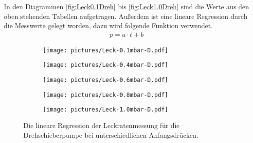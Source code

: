 In den Diagrammen \eqref{fig:Leck0.1Dreh} bis \eqref{fig:Leck1.0Dreh} sind die Werte aus den oben stehenden Tabellen aufgetragen. Außerdem ist eine lineare Regression durch die Messwerte gelegt worden, dazu wird folgende Funktion verwendet.
\begin{align}
  p = a \cdot t + b
\end{align}

\begin{figure}[H]
  \begin{subfigure}[c]{0.49\textwidth}
    \texttt{[image: pictures/Leck-0.1mbar-D.pdf]}
    \label{fig:Leck0.1Dreh}
  \end{subfigure}\hfill
  \begin{subfigure}[c]{0.49\textwidth}
    \texttt{[image: pictures/Leck-0.4mbar-D.pdf]}
    \label{fig:Leck0.4Dreh}
  \end{subfigure}

  \begin{subfigure}[c]{0.49\textwidth}
    \texttt{[image: pictures/Leck-0.6mbar-D.pdf]}
    \label{fig:Leck0.6Dreh}
  \end{subfigure}\hfill
  \begin{subfigure}[c]{0.49\textwidth}
    \texttt{[image: pictures/Leck-0.8mbar-D.pdf]}
    \label{fig:Leck0.8Dreh}
  \end{subfigure}

  \begin{subfigure}[c]{0.49\textwidth}
    \texttt{[image: pictures/Leck-1.0mbar-D.pdf]}
    \label{fig:Leck1.0Dreh}
  \end{subfigure}
  \caption{Die lineare Regression der Leckratenmessung für die Drehschieberpumpe bei unterschiedlichen Anfangsdrücken.}
\end{figure}


